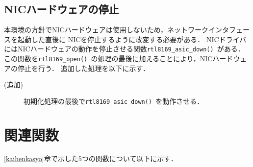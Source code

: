\documentclass[12pt]{jsarticle}
\begin{document}
\subsection{NICハードウェアの停止}
本環境の方針でNICハードウェアは使用しないため，ネットワークインタフェースを起動した直後に
NICを停止するように改変する必要がある．
NICドライバにはNICハードウェアの動作を停止させる関数{\tt rtl8169\_asic\_down() }がある．
この関数を{\tt rtl8169\_open() }の処理の最後に加えることにより，NICハードウェアの停止を行う．
追加した処理を以下に示す．
\begin{description}
    \item[(追加)]初期化処理の最後で{\tt rtl8169\_asic\_down() }を動作させる．
\end{description}

\section{関連関数}
\ref{kaihenkasyo}章で示した5つの関数について以下に示す．
\end{document}
